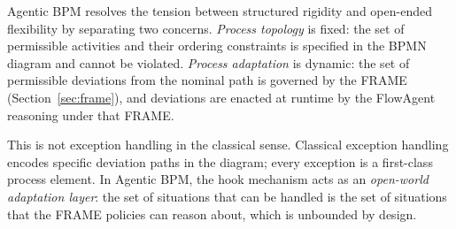 \documentclass[11pt,a4paper]{article}
\begin{document}
Agentic BPM resolves the tension between structured rigidity and open-ended
flexibility by separating two concerns. \emph{Process topology} is fixed: the
set of permissible activities and their ordering constraints is specified in the
BPMN diagram and cannot be violated. \emph{Process adaptation} is dynamic: the
set of permissible deviations from the nominal path is governed by the FRAME
(Section~\ref{sec:frame}), and deviations are enacted at runtime by the
FlowAgent reasoning under that FRAME.

This is not exception handling in the classical sense. Classical exception
handling encodes specific deviation paths in the diagram; every exception is
a first-class process element. In Agentic BPM, the hook mechanism acts as an
\emph{open-world adaptation layer}: the set of situations that can be handled
is the set of situations that the FRAME policies can reason about, which is
unbounded by design.
\end{document}
